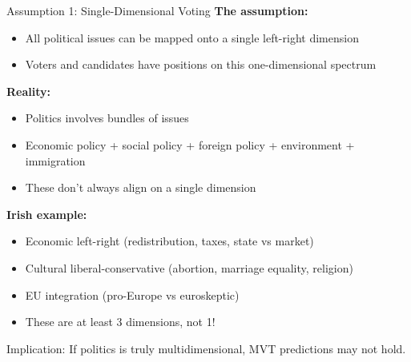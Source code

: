 \documentclass[10pt]{beamer}
\begin{document}
\begin{frame}[allowframebreaks]{Assumption 1: Single-Dimensional Voting}
\textbf{The assumption:}
\begin{itemize}
\item All political issues can be mapped onto a single left-right dimension
\item Voters and candidates have positions on this one-dimensional spectrum
\end{itemize}



\textbf{Reality:}
\begin{itemize}
\item Politics involves \alert{bundles} of issues
\item Economic policy + social policy + foreign policy + environment + immigration
\item These don't always align on a single dimension
\end{itemize}

 \framebreak   

\textbf{Irish example:}
\begin{itemize}
\item Economic left-right (redistribution, taxes, state vs market)
\item Cultural liberal-conservative (abortion, marriage equality, religion)
\item EU integration (pro-Europe vs euroskeptic)
\item These are \alert{at least 3 dimensions}, not 1!
\end{itemize}



\alert{Implication:} If politics is truly multidimensional, MVT predictions may not hold.
\end{frame}
\end{document}
